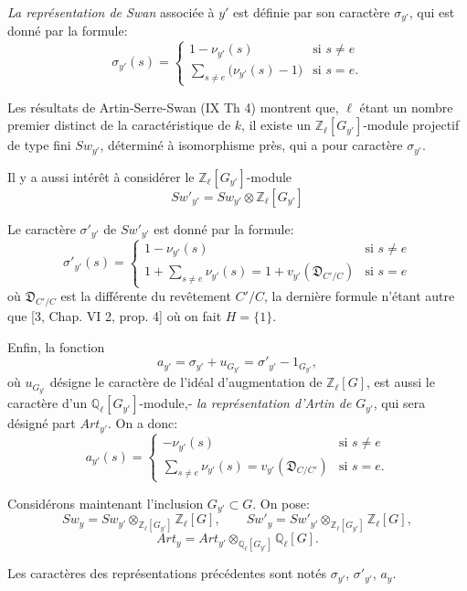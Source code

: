 \documentclass[11pt]{article}
\begin{document}
\emph{La représentation de Swan} associée à $y'$ est définie par son caractère $\sigma_{y'}$, qui est donné par la formule:
\[
\sigma_{y'}(s)=
\begin{cases}
1-\nu_{y'}(s)& \text{si } s\ne e\\[0.4em]
\displaystyle\sum_{s\ne e}\bigl(\nu_{y'}(s)-1\bigr)& \text{si } s=e.
\end{cases}
\tag{4.2.2}
\]

Les résultats de Artin-Serre-Swan (IX Th 4) montrent que, $\ell$ étant un nombre premier distinct de la caractéristique de $k$, il existe un $\mathbb Z_\ell[G_{y'}]$-module projectif de type fini $Sw_{y'}$, déterminé à isomorphisme près, qui a pour caractère $\sigma_{y'}$.

Il y a aussi intérêt à considérer le $\mathbb Z_\ell[G_{y'}]$-module
\[
Sw'_{y'}=Sw_{y'}\otimes\mathbb Z_\ell[G_{y'}]
\tag{4.2.3}
\]

Le caractère $\sigma'_{y'}$ de $Sw'_{y'}$ est donné par la formule:
\[
\sigma'_{y'}(s)=
\begin{cases}
1-\nu_{y'}(s)& \text{si } s\ne e\\[0.4em]
\displaystyle 1+\sum_{s\ne e}\nu_{y'}(s)
=1+v_{y'}(\mathfrak D_{C'/C})& \text{si } s=e
\end{cases}
\tag{4.2.4}
\]
où $\mathfrak D_{C'/C}$ est la différente du
revêtement $C'/C$, la dernière formule n'étant autre que [3, Chap. VI 2, prop. 4] où on fait $H=\{1\}$.

Enfin, la fonction
\[
a_{y'}=\sigma_{y'}+u_{G_{y'}}=\sigma'_{y'}-1_{G_{y'}},
\tag{4.2.5}
\]
où $u_{G_{y'}}$ désigne le caractère de l'idéal d'augmentation de $\mathbb Z_\ell[G]$, est aussi le caractère d'un $\mathbb Q_\ell[G_{y'}]$-module,- \emph{la représentation d'Artin de} $G_{y'}$, qui sera désigné part $Art_{y'}$.
On a donc:
\[
a_{y'}(s)=
\begin{cases}
-\nu_{y'}(s)& \text{si } s\ne e\\[0.4em]
\displaystyle\sum_{s\ne e}\nu_{y'}(s)=v_{y'}(\mathfrak D_{C/C'})& \text{si } s=e.
\end{cases}
\tag{4.2.6}
\]

Considérons maintenant l'inclusion $G_{y'}\subset G$. On pose:
\[
Sw_y=Sw_{y'}\otimes_{\mathbb Z_\ell[G_{y'}]}\mathbb Z_\ell[G],
\qquad
Sw'_y=Sw'_{y'}\otimes_{\mathbb Z_\ell[G_{y'}]}\mathbb Z_\ell[G],
\tag{4.2.7}
\]
\[
Art_y=Art_{y'}\otimes_{\mathbb Q_\ell[G_{y'}]}\mathbb Q_\ell[G].
\tag{4.2.8}
\]

Les caractères des représentations précédentes sont notés $\sigma_{y'}$, $\sigma'_{y'}$, $a_y$.
\end{document}

